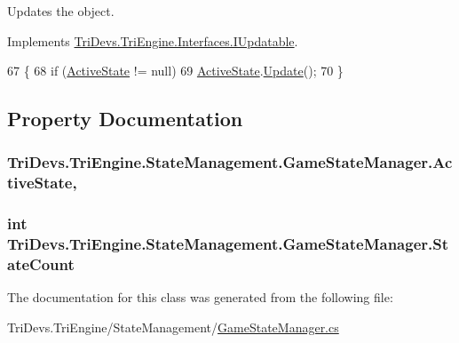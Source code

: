 Updates the object. 



Implements \hyperlink{interface_tri_devs_1_1_tri_engine_1_1_interfaces_1_1_i_updatable_a5392174d0eb92b04a0ef1908ce725f29}{Tri\-Devs.\-Tri\-Engine.\-Interfaces.\-I\-Updatable}.


\begin{DoxyCode}
67         \{
68             \textcolor{keywordflow}{if} (\hyperlink{class_tri_devs_1_1_tri_engine_1_1_state_management_1_1_game_state_manager_ac6aa0b66c98f54ff1e15724ad7cc0fb0}{ActiveState} != null)
69                 \hyperlink{class_tri_devs_1_1_tri_engine_1_1_state_management_1_1_game_state_manager_ac6aa0b66c98f54ff1e15724ad7cc0fb0}{ActiveState}.\hyperlink{interface_tri_devs_1_1_tri_engine_1_1_interfaces_1_1_i_updatable_a5392174d0eb92b04a0ef1908ce725f29}{Update}();
70         \}
\end{DoxyCode}


\subsection{Property Documentation}
\hypertarget{class_tri_devs_1_1_tri_engine_1_1_state_management_1_1_game_state_manager_ac6aa0b66c98f54ff1e15724ad7cc0fb0}{
\subsubsection[{Active\-State}]{ Tri\-Devs.\-Tri\-Engine.\-State\-Management.\-Game\-State\-Manager.\-Active\-State\hspace{0.3cm}{\ttfamily [get]}, {\ttfamily [set]}}}\label{class_tri_devs_1_1_tri_engine_1_1_state_management_1_1_game_state_manager_ac6aa0b66c98f54ff1e15724ad7cc0fb0}
\hypertarget{class_tri_devs_1_1_tri_engine_1_1_state_management_1_1_game_state_manager_af2985bcebde75a96311a7bbc64920f5c}{
\subsubsection[{State\-Count}]{\setlength{\rightskip}{0pt plus 5cm}int Tri\-Devs.\-Tri\-Engine.\-State\-Management.\-Game\-State\-Manager.\-State\-Count\hspace{0.3cm}{\ttfamily [get]}}}\label{class_tri_devs_1_1_tri_engine_1_1_state_management_1_1_game_state_manager_af2985bcebde75a96311a7bbc64920f5c}


The documentation for this class was generated from the following file\-:\begin{DoxyCompactItemize}
\item 
Tri\-Devs.\-Tri\-Engine/\-State\-Management/\hyperlink{_game_state_manager_8cs}{Game\-State\-Manager.\-cs}\end{DoxyCompactItemize}
